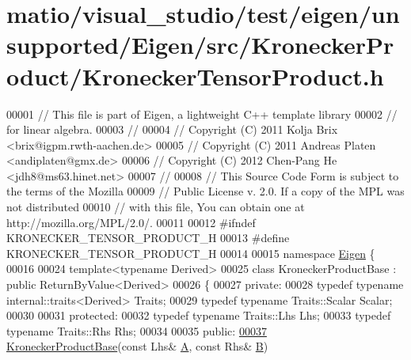 \hypertarget{matio_2visual__studio_2test_2eigen_2unsupported_2_eigen_2src_2_kronecker_product_2_kronecker_tensor_product_8h_source}{}\section{matio/visual\+\_\+studio/test/eigen/unsupported/\+Eigen/src/\+Kronecker\+Product/\+Kronecker\+Tensor\+Product.h}
\label{matio_2visual__studio_2test_2eigen_2unsupported_2_eigen_2src_2_kronecker_product_2_kronecker_tensor_product_8h_source}

\begin{DoxyCode}
00001 \textcolor{comment}{// This file is part of Eigen, a lightweight C++ template library}
00002 \textcolor{comment}{// for linear algebra.}
00003 \textcolor{comment}{//}
00004 \textcolor{comment}{// Copyright (C) 2011 Kolja Brix <brix@igpm.rwth-aachen.de>}
00005 \textcolor{comment}{// Copyright (C) 2011 Andreas Platen <andiplaten@gmx.de>}
00006 \textcolor{comment}{// Copyright (C) 2012 Chen-Pang He <jdh8@ms63.hinet.net>}
00007 \textcolor{comment}{//}
00008 \textcolor{comment}{// This Source Code Form is subject to the terms of the Mozilla}
00009 \textcolor{comment}{// Public License v. 2.0. If a copy of the MPL was not distributed}
00010 \textcolor{comment}{// with this file, You can obtain one at http://mozilla.org/MPL/2.0/.}
00011 
00012 \textcolor{preprocessor}{#ifndef KRONECKER\_TENSOR\_PRODUCT\_H}
00013 \textcolor{preprocessor}{#define KRONECKER\_TENSOR\_PRODUCT\_H}
00014 
00015 \textcolor{keyword}{namespace }\hyperlink{namespace_eigen}{Eigen} \{
00016 
00024 \textcolor{keyword}{template}<\textcolor{keyword}{typename} Derived>
00025 \textcolor{keyword}{class }KroneckerProductBase : \textcolor{keyword}{public} ReturnByValue<Derived>
00026 \{
00027   \textcolor{keyword}{private}:
00028     \textcolor{keyword}{typedef} \textcolor{keyword}{typename} internal::traits<Derived> Traits;
00029     \textcolor{keyword}{typedef} \textcolor{keyword}{typename} Traits::Scalar Scalar;
00030 
00031   \textcolor{keyword}{protected}:
00032     \textcolor{keyword}{typedef} \textcolor{keyword}{typename} Traits::Lhs Lhs;
00033     \textcolor{keyword}{typedef} \textcolor{keyword}{typename} Traits::Rhs Rhs;
00034 
00035   \textcolor{keyword}{public}:
\hyperlink{class_eigen_1_1_kronecker_product_base_a0cb05eaa978b9fdc0285b48a6e0ecfb1}{00037}     \hyperlink{class_eigen_1_1_kronecker_product_base_a0cb05eaa978b9fdc0285b48a6e0ecfb1}{KroneckerProductBase}(\textcolor{keyword}{const} Lhs& \hyperlink{group___core___module_class_eigen_1_1_matrix}{A}, \textcolor{keyword}{const} Rhs& \hyperlink{group___core___module_class_eigen_1_1_matrix}{B})

\end{DoxyCode}
